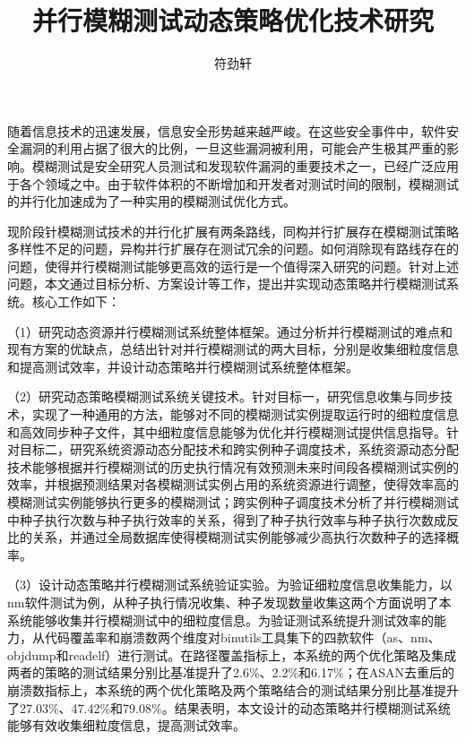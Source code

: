 \documentclass[master]{thesis-uestc}
\title{并行模糊测试动态策略优化技术研究}{Research on Parallel Fuzzing with Dynamic Strategy Optimization Techniques} %
\author{符劲轩}{Jingxuan Fu} %
\begin{document}
\makecover %
\originalitydeclaration %
\begin{chineseabstract}

随着信息技术的迅速发展，信息安全形势越来越严峻。在这些安全事件中，软件安全漏洞的利用占据了很大的比例，一旦这些漏洞被利用，可能会产生极其严重的影响。模糊测试是安全研究人员测试和发现软件漏洞的重要技术之一，已经广泛应用于各个领域之中。由于软件体积的不断增加和开发者对测试时间的限制，模糊测试的并行化加速成为了一种实用的模糊测试优化方式。

现阶段针模糊测试技术的并行化扩展有两条路线，同构并行扩展存在模糊测试策略多样性不足的问题，异构并行扩展存在测试冗余的问题。如何消除现有路线存在的问题，使得并行模糊测试能够更高效的运行是一个值得深入研究的问题。针对上述问题，本文通过目标分析、方案设计等工作，提出并实现动态策略并行模糊测试系统。核心工作如下：

（1）研究动态资源并行模糊测试系统整体框架。通过分析并行模糊测试的难点和现有方案的优缺点，总结出针对并行模糊测试的两大目标，分别是收集细粒度信息和提高测试效率，并设计动态策略并行模糊测试系统整体框架。

（2）研究动态策略模糊测试系统关键技术。针对目标一，研究信息收集与同步技术，实现了一种通用的方法，能够对不同的模糊测试实例提取运行时的细粒度信息和高效同步种子文件，其中细粒度信息能够为优化并行模糊测试提供信息指导。针对目标二，研究系统资源动态分配技术和跨实例种子调度技术，系统资源动态分配技术能够根据并行模糊测试的历史执行情况有效预测未来时间段各模糊测试实例的效率，并根据预测结果对各模糊测试实例占用的系统资源进行调整，使得效率高的模糊测试实例能够执行更多的模糊测试；跨实例种子调度技术分析了并行模糊测试中种子执行次数与种子执行效率的关系，得到了种子执行效率与种子执行次数成反比的关系，并通过全局数据库使得模糊测试实例能够减少高执行次数种子的选择概率。

（3）设计动态策略并行模糊测试系统验证实验。为验证细粒度信息收集能力，以nm软件测试为例，从种子执行情况收集、种子发现数量收集这两个方面说明了本系统能够收集并行模糊测试中的细粒度信息。为验证测试系统提升测试效率的能力，从代码覆盖率和崩溃数两个维度对binutils工具集下的四款软件（as、nm、objdump和readelf）进行测试。在路径覆盖指标上，本系统的两个优化策略及集成两者的策略的测试结果分别比基准提升了2.6\%、2.2\%和6.17\%；在ASAN去重后的崩溃数指标上，本系统的两个优化策略及两个策略结合的测试结果分别比基准提升了27.03\%、47.42\%和79.08\%。结果表明，本文设计的动态策略并行模糊测试系统能够有效收集细粒度信息，提高测试效率。

\end{chineseabstract}
\end{document}
